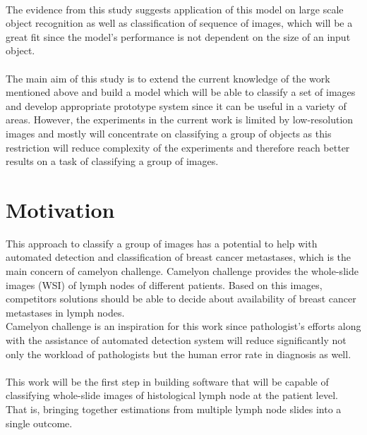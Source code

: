  \paragraph{} The evidence from this study suggests application of this model on large scale
 object recognition as well as classification of sequence of images, which will
 be a great fit since the model's performance is not dependent on the size of an input object.

 \paragraph{} The main aim of this study is to extend the current knowledge of the work mentioned
 above and build a model which will be able to classify a set of images and develop appropriate
 prototype system since it can be useful in a variety of areas. However,
 the experiments in the current work is limited by low-resolution images and mostly will concentrate
 on classifying a group of objects as this restriction will reduce complexity
 of the experiments and therefore reach better results on a task of classifying
 a group of images.

\section{Motivation}
This approach to classify a group of images has a potential to help with automated
detection and classification of breast cancer metastases, which is the main concern
of camelyon challenge. Camelyon challenge provides the whole-slide images (WSI)
of lymph nodes of different patients. Based on this images, competitors solutions should be able to
decide about availability of breast cancer metastases in lymph nodes. \cite{CAMEL}
\\
Camelyon challenge is an inspiration for this work since pathologist's efforts
along with the assistance of automated detection system will reduce significantly
not only the workload of pathologists but the human error rate in diagnosis as well.

\paragraph{}
This work will be the first step in building software that will be capable of
classifying whole-slide images of histological lymph node at the patient level.
That is, bringing together estimations from multiple lymph node slides into a single outcome.

